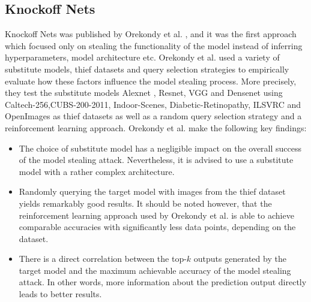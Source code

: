 \subsection{Knockoff Nets}
\label{sec:Related_work:Model_Stealing:Knockoff_Nets}
Knockoff Nets was published by Orekondy et al. \cite{orekondy2019knockoff}, and it was the first approach which focused only on stealing the functionality
of the model instead of inferring hyperparameters, model architecture etc. Orekondy et al. used a variety of substitute models, thief datasets and query
selection strategies to empirically evaluate how these factors influence the model stealing process. More precisely, they test the substitute models
Alexnet \cite{krizhevsky2017imagenet}, Resnet, VGG and Densenet \cite{huang2017densely} using Caltech-256,CUBS-200-2011, Indoor-Scenes, Diabetic-Retinopathy,
ILSVRC and OpenImages as thief datasets as well as a random query selection strategy and a reinforcement learning approach. Orekondy et al. make the following
key findings: 
\begin{itemize}
    \item The choice of substitute model has a negligible impact on the overall success of the model stealing attack. Nevertheless, it is advised to use a
    substitute model with a rather complex architecture.
    \item Randomly querying the target model with images from the thief dataset yields remarkably good results. It should be noted however, that the reinforcement
    learning approach used by Orekondy et al. is able to achieve comparable accuracies with significantly less data points, depending on the dataset.
    \item There is a direct correlation between the top-$k$ outputs generated by the target model and the maximum achievable accuracy of the model stealing attack.
    In other words, more information about the prediction output directly leads to better results.
\end{itemize}
